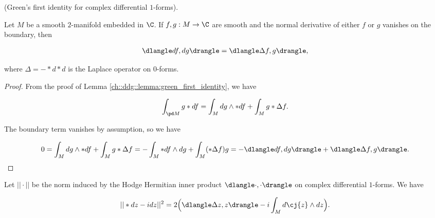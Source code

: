 \begin{lemma}
    (Green's first identity for complex differential $1$-forms).
    
    Let $M$ be a smooth $2$-manifold embedded in $\C$. If $f, g:M \rightarrow \C$ are smooth and the normal derivative of either $f$ or $g$ vanishes on the boundary, then
    
    \begin{align*}
        \dlangle df, dg \drangle = \dlangle \Delta f, g \drangle,
    \end{align*}
    
    where $\Delta = -*d*d$ is the Laplace operator on $0$-forms.
\end{lemma}

\begin{proof}
    From the proof of Lemma \ref{ch::ddg::lemma:green_first_identity}, we have
    
    \begin{align*}
        \int_{\pd M} g * df =  \int_M dg \wedge *df + \int_M g *\Delta f.
    \end{align*}
    
    The boundary term vanishes by assumption, so we have
    
    \begin{align*}
        0 = \int_M dg \wedge *df + \int_M g *\Delta f = -\int_M *df \wedge dg + \int_M (*\Delta f) g = -\dlangle df, dg \drangle + \dlangle \Delta f, g \drangle.
    \end{align*}
\end{proof}

\begin{lemma}
    Let $||\cdot||$ be the norm induced by the Hodge Hermitian inner product $\dlangle \cdot, \cdot \drangle$ on complex differential $1$-forms. We have
    
    \begin{align*}
        ||*dz - idz||^2 = 2 \Big( \dlangle \Delta z, z \drangle - i \int_M d\cj{z} \wedge dz \Big).
    \end{align*}
\end{lemma}

